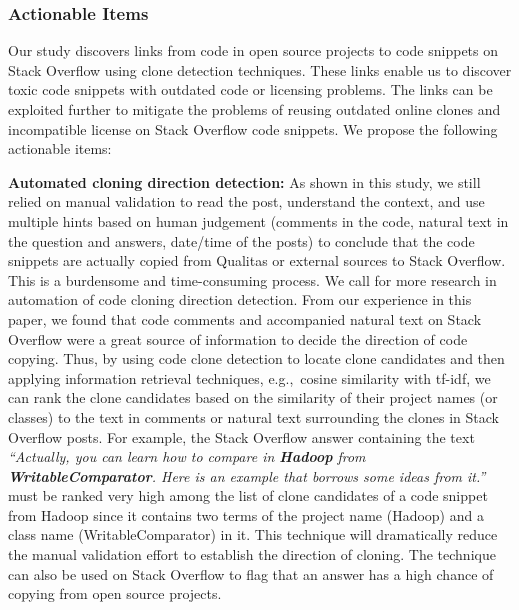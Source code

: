 \documentclass[10pt,journal,compsoc]{IEEEtran}
\begin{document}
\subsubsection{Actionable Items}
Our study discovers links from code in open source projects to code snippets on
Stack Overflow using clone detection techniques. These links enable us to
discover toxic code snippets with outdated code or licensing problems. 
The links can be exploited further to mitigate the problems of reusing outdated online clones and
incompatible license on Stack Overflow code snippets. We propose the following
actionable items: 

\textbf{Automated cloning direction detection:} 
As shown in this study, we still relied on manual
validation to read the post, understand the context, and use multiple hints
based on human judgement (comments in the code, natural text in the question and
answers, date/time of the posts) to conclude that the code snippets are actually
copied from Qualitas or external sources to Stack Overflow. 
This is a burdensome and time-consuming process. We call for more research in
automation of code cloning direction detection. From our experience in this
paper, we found that code comments and accompanied natural text
on Stack Overflow were a great source of information to decide the direction of
code copying. Thus, by using code clone detection to locate clone candidates
and then applying information retrieval techniques, e.g.,~cosine similarity with tf-idf, 
we can rank the clone candidates based on the similarity of their project names (or classes) to the text in 
comments or natural text surrounding the clones in Stack Overflow posts.
For example, the Stack Overflow answer containing the text \textit{``Actually, you can learn how to compare in \textbf{Hadoop}
from \textbf{WritableComparator}. Here is an example that borrows some ideas from it.''}
must be ranked very high among the list of clone candidates of a code snippet
from Hadoop since it contains two terms of the project name (Hadoop) and a class name (WritableComparator)
in it.
This technique will dramatically reduce the manual validation effort to establish
the direction of cloning. The technique can also be used on Stack Overflow to 
flag that an answer has a high chance of copying from open source projects.
\end{document}
